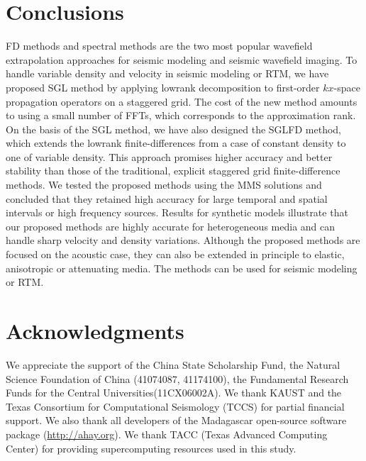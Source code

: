 \section{Conclusions}
FD methods and spectral methods are the two most popular wavefield extrapolation approaches for seismic modeling and seismic wavefield imaging. To handle variable density and velocity in seismic modeling or RTM, we have proposed SGL method by applying lowrank decomposition to first-order $kx$-space propagation operators on a staggered grid. The cost of the new method amounts to using a small number of FFTs, which corresponds to the approximation rank. On the basis of the SGL method, we have also designed the SGLFD method, which extends the lowrank finite-differences from a case of constant density to one of variable density. This approach promises higher accuracy and better stability than those of the traditional, explicit staggered grid finite-difference methods. We tested the proposed methods using the MMS solutions and concluded that they retained high accuracy for large temporal and spatial intervals or high frequency sources. Results for synthetic models illustrate that our proposed methods are highly accurate for heterogeneous media and can handle sharp velocity and density variations. Although the proposed methods are focused on the acoustic case, they can also be extended in principle to elastic, anisotropic or attenuating media. The methods can be used for seismic modeling or RTM.  


\section{Acknowledgments}
We appreciate the support of the China State Scholarship Fund, the Natural Science
Foundation of China (41074087, 41174100), the Fundamental Research Funds for the Central Universities(11CX06002A). We thank KAUST and the Texas Consortium for Computational Seismology (TCCS) for partial financial support. We also thank all developers of the Madagascar open-source software package (\url{http://ahay.org}). We thank TACC (Texas Advanced Computing Center) for providing supercomputing resources used in this study. 







